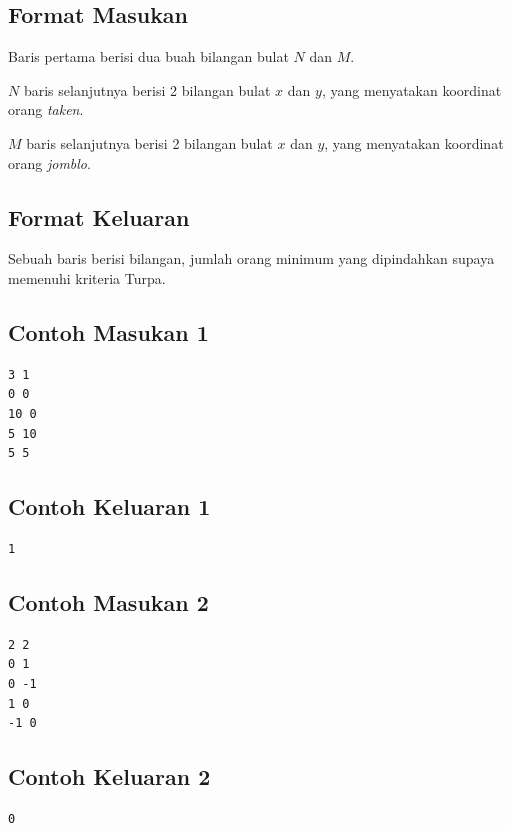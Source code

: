 \documentclass{article}
\begin{document}
\subsection*{Format Masukan}

\par\noindent Baris pertama berisi dua buah bilangan bulat $N$ dan $M$.
\par\noindent $N$ baris selanjutnya berisi 2 bilangan bulat $x$ dan $y$, yang menyatakan koordinat orang \textit{taken}.
\par\noindent $M$ baris selanjutnya berisi 2 bilangan bulat $x$ dan $y$, yang menyatakan koordinat orang \textit{jomblo}.

\subsection*{Format Keluaran}

\par\noindent Sebuah baris berisi bilangan, jumlah orang minimum yang dipindahkan supaya memenuhi kriteria Turpa.

\subsection*{Contoh Masukan 1}

\begin{lstlisting}
3 1
0 0
10 0
5 10
5 5
\end{lstlisting}

\subsection*{Contoh Keluaran 1}

\begin{lstlisting}
1
\end{lstlisting}

\subsection*{Contoh Masukan 2}

\begin{lstlisting}
2 2
0 1
0 -1
1 0
-1 0
\end{lstlisting}

\subsection*{Contoh Keluaran 2}

\begin{lstlisting}
0
\end{lstlisting}
\end{document}
